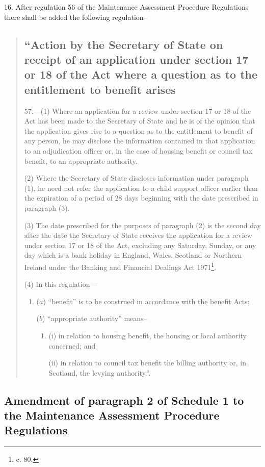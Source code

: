 \documentclass[12pt,a4paper]{article}
\begin{document}
16.  After regulation 56 of the Maintenance Assessment Procedure Regulations there shall be added the following regulation–
\begin{quotation}
\subsection*{“Action by the Secretary of State on receipt of an application under section 17 or 18 of the Act where a question as to the entitlement to benefit arises}

57.—(1) Where an application for a review under section 17 or 18 of the Act has been made to the Secretary of State and he is of the opinion that the application gives rise to a question as to the entitlement to benefit of any person, he may disclose the information contained in that application to an adjudication officer or, in the case of housing benefit or council tax benefit, to an appropriate authority.

(2) Where the Secretary of State discloses information under paragraph (1), he need not refer the application to a child support officer earlier than the expiration of a period of 28 days beginning with the date prescribed in paragraph (3).

(3) The date prescribed for the purposes of paragraph (2) is the second day after the date the Secretary of State receives the application for a review under section 17 or 18 of the Act, excluding any Saturday, Sunday, or any day which is a bank holiday in England, Wales, Scotland or Northern Ireland under the Banking and Financial Dealings Act 1971\footnote{ c. 80.}.

(4) In this regulation---
\begin{enumerate}\item[]
($a$) “benefit” is to be construed in accordance with the benefit Acts;

($b$) “appropriate authority” means–
\begin{enumerate}\item[]
(i) in relation to housing benefit, the housing or local authority concerned; and

(ii) in relation to council tax benefit the billing authority or, in Scotland, the levying authority.”.
\end{enumerate}
\end{enumerate}
\end{quotation}

\subsection[17. Amendment of paragraph 2 of Schedule 1 to the Maintenance Assessment Procedure Regulations]{Amendment of paragraph 2 of Schedule 1 to the Maintenance Assessment Procedure Regulations}
\end{document}
